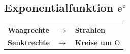 	\begin{minipage}[t]{0.5\textwidth}
		\subsection{Exponentialfunktion $\mathrm{e}^z$}
			\begin{minipage}[t]{0.3\textwidth}
			\end{minipage}
			\begin{minipage}[t]{0.7\textwidth}
				\begin{tabular}{lcl}
					\textbf{Waagrechte} & $\rightarrow$ & \textbf{Strahlen}\\[3pt]
					\textbf{Senktrechte} & $\rightarrow$ & \textbf{Kreise um $\mathrm{O}$}\\[3pt]
				\end{tabular}
			\end{minipage}
			\scalebox{0.5}{}
	\end{minipage}